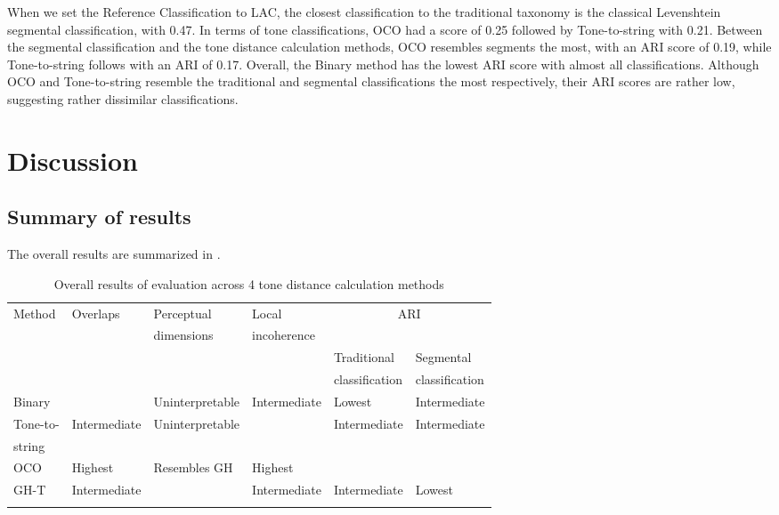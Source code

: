 \documentclass[output=paper, chinesefont]{langscibook}
\begin{document}
When we set the Reference Classification to LAC, the closest classification to the traditional taxonomy is the classical Levenshtein segmental classification, with 0.47. In terms of tone classifications, OCO had a score of 0.25 followed by Tone-to-string with 0.21. Between the segmental classification and the tone distance calculation methods, OCO resembles segments the most, with an ARI score of 0.19, while Tone-to-string follows with an ARI of 0.17. Overall, the Binary method has the lowest ARI score with almost all classifications. Although OCO and Tone-to-string resemble the traditional and segmental classifications the most respectively, their ARI scores are rather low, suggesting rather dissimilar classifications.

\section{Discussion}
\label{sec:sung:6}
\subsection{Summary of results} \label{sec:sung:6.1}

The overall results are summarized in .

\begin{table}
\footnotesize
\begin{tabularx}{\textwidth}{llllll}
\lsptoprule
{Method} & {Overlaps} & {Perceptual} & {Local} & \multicolumn{2}{c}{ARI}\\
& & dimensions & incoherence & & \\\cmidrule(lr){5-6}
& & & & Traditional & Segmental \\
& & & & classification & classification\\
\midrule
 Binary & \cellcolor[gray]{0.9}{None} & Uninterpretable & Intermediate & Lowest & Intermediate\\
 Tone-to- & Intermediate & Uninterpretable & \cellcolor[gray]{0.9}{Lowest} & Intermediate & Intermediate\\
 string & & & & & \\
 OCO & Highest & Resembles GH & Highest & \cellcolor[gray]{0.9}{Highest} & \cellcolor[gray]{0.9}{Highest}\\
 GH-T & Intermediate & \cellcolor[gray]{0.9}{Identical to GH} & Intermediate & Intermediate & Lowest\\
\lspbottomrule
\end{tabularx}
\caption{Overall results of evaluation across 4 tone distance calculation methods}
\label{tab:sung:11}
\end{table}
\end{document}
